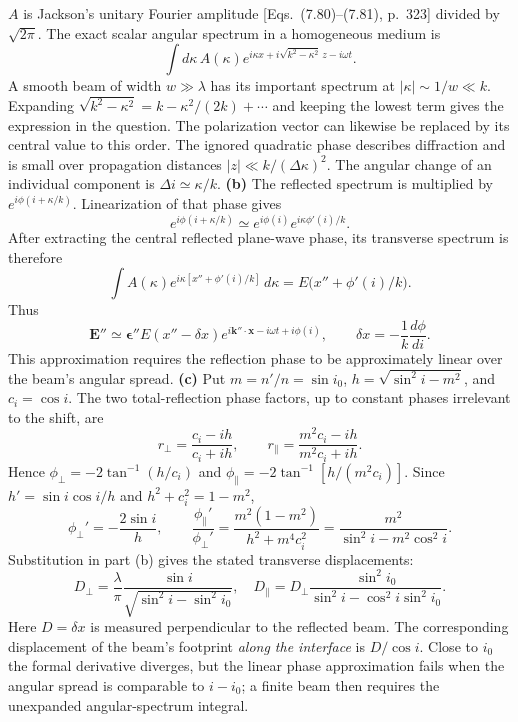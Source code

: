 $A$ is Jackson's unitary Fourier amplitude [Eqs.~(7.80)--(7.81),
p.~323] divided by $\sqrt{2\pi}$.
The exact scalar angular spectrum in a homogeneous medium is
\[
\int d\kappa\,A(\kappa)
 e^{i\kappa x+i\sqrt{k^2-\kappa^2}\,z-i\omega t}.
\]
A smooth beam of width $w\gg\lambda$ has its important spectrum
at $|\kappa|\sim1/w\ll k$. Expanding
$\sqrt{k^2-\kappa^2}=k-\kappa^2/(2k)+\cdots$ and keeping the
lowest term gives the expression in the question. The polarization
vector can likewise be replaced by its central value to this order.
The ignored quadratic phase describes diffraction and is small over
propagation distances $|z|\ll k/(\Delta\kappa)^2$.
The angular change of an individual component is
$\Delta i\simeq\kappa/k$.
\textbf{(b)} The reflected spectrum is multiplied by
$e^{i\phi(i+\kappa/k)}$. Linearization of that phase gives
\[
e^{i\phi(i+\kappa/k)}
\simeq e^{i\phi(i)}e^{i\kappa\phi'(i)/k}.
\]
After extracting the central reflected plane-wave phase, its
transverse spectrum is therefore
\[
\int A(\kappa)e^{i\kappa[x''+\phi'(i)/k]}\,d\kappa
=E\bigl(x''+\phi'(i)/k\bigr).
\]
Thus
\[
\boxed{\mathbf E''\simeq\boldsymbol\epsilon''E(x''-\delta x)
 e^{i\mathbf k''\cdot\mathbf x-i\omega t+i\phi(i)},\qquad
\delta x=-\frac1k\frac{d\phi}{di}.}
\]
This approximation requires the reflection phase to be approximately
linear over the beam's angular spread.
\textbf{(c)} Put $m=n'/n=\sin i_0$,
$h=\sqrt{\sin^2i-m^2}$, and $c_i=\cos i$.
The two total-reflection phase factors, up to constant phases
irrelevant to the shift, are
\[
r_\perp=\frac{c_i-ih}{c_i+ih},\qquad
r_\parallel=\frac{m^2c_i-ih}{m^2c_i+ih}.
\]
Hence $\phi_\perp=-2\tan^{-1}(h/c_i)$ and
$\phi_\parallel=-2\tan^{-1}[h/(m^2c_i)]$.
Since $h'=\sin i\cos i/h$ and $h^2+c_i^2=1-m^2$,
\[
\phi_\perp'=-\frac{2\sin i}{h},\qquad
\frac{\phi_\parallel'}{\phi_\perp'}
=\frac{m^2(1-m^2)}{h^2+m^4c_i^2}
=\frac{m^2}{\sin^2i-m^2\cos^2i}.
\]
Substitution in part (b) gives the stated transverse displacements:
\[
\boxed{D_\perp=\frac\lambda\pi\frac{\sin i}{\sqrt{\sin^2i-\sin^2i_0}},
\quad D_\parallel=D_\perp
\frac{\sin^2i_0}{\sin^2i-\cos^2i\sin^2i_0}.}
\]
Here $D=\delta x$ is measured perpendicular to the reflected beam.
The corresponding displacement of the beam's footprint \emph{along
the interface} is $D/\cos i$. Close to $i_0$ the formal derivative
diverges, but the linear phase approximation fails when the angular
spread is comparable to $i-i_0$; a finite beam then requires the
unexpanded angular-spectrum integral.

